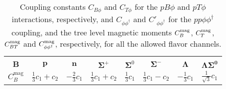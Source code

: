 \documentclass[preprintnumbers,prd,superscriptaddress,preprint]{revtex4-1}
\begin{document}
\begin{table}[b]
\begin{center}
\caption{Coupling constants $C_{B\phi}$ and $C_{T\phi}$ for the $p B \phi$ and $p T \phi$ interactions, respectively, and $C_{\phi\phi^\dag}$ and $C'_{\phi\phi^\dag}$ for the $p p \phi \phi^\dag$ coupling, and the tree level magnetic moments $C_B^{\rm mag}$, $C_T^{\rm mag}$, $C_{BT}^{\rm mag}$ and $C_{\phi\phi^\dag}^{\rm mag}$, respectively, for all the allowed flavor channels.}
%
{\normalsize
\begin{tabular}{c|ccccccc} \hline
&&&&&&& \\
\hspace*{0.1cm}$\bm B$ \hspace*{0.1cm}
& \hspace*{0.1cm}$\bm p$ \hspace*{0.1cm}
& \hspace*{0.1cm}$\bm n$ \hspace*{0.1cm}
& \hspace*{0.1cm}$\bm \Sigma^+$\hspace*{0.1cm}
& \hspace*{0.1cm}$\bm \Sigma^0$\hspace*{0.1cm}
& \hspace*{0.1cm}$\bm \Sigma^-$\hspace*{0.1cm}
& \hspace*{0.1cm}$\bm \Lambda$\hspace*{0.1cm}	
& \hspace*{0.1cm}$\bm{\Lambda\Sigma^0}$\hspace*{0.1cm}
\\
\hspace*{0.1cm}$C_{B}^{\text {mag}}$\hspace*{0.1cm}
& \hspace*{0.1cm}$\frac13c_1 +c_2$\hspace*{0.1cm}
& \hspace*{0.1cm}$-\frac23 c_1$\hspace*{0.1cm}
& \hspace*{0.1cm}$\frac13c_1 +c_2$\hspace*{0.1cm}
& \hspace*{0.1cm}$\frac13 c_1$\hspace*{0.1cm}
& \hspace*{0.1cm}$\frac13 c_1-c_2$\hspace*{0.1cm}
& \hspace*{0.1cm}$-\frac13 c_1$\hspace*{0.1cm}	
& \hspace*{0.1cm}$\frac{1}{\sqrt{3}} c_1$\hspace*{0.1cm}	 

\end{tabular}}
\end{center}
\end{table}
\end{document}
